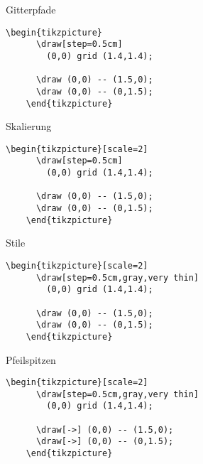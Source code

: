\begin{Frame}[t,fragile]{Gitterpfade}

  \xxx

  \begin{lstlisting}[gobble=4]
    \begin{tikzpicture}
      \draw[step=0.5cm]
        (0,0) grid (1.4,1.4);

      \draw (0,0) -- (1.5,0);
      \draw (0,0) -- (0,1.5);
    \end{tikzpicture}
  \end{lstlisting}
\end{Frame}

\begin{Frame}[t,fragile]{Skalierung}

  \xxx

  \begin{lstlisting}[gobble=4]
    \begin{tikzpicture}[scale=2]
      \draw[step=0.5cm]
        (0,0) grid (1.4,1.4);

      \draw (0,0) -- (1.5,0);
      \draw (0,0) -- (0,1.5);
    \end{tikzpicture}
  \end{lstlisting}
\end{Frame}

\begin{Frame}[t,fragile]{Stile}

  \xxx

  \begin{lstlisting}[gobble=4]
    \begin{tikzpicture}[scale=2]
      \draw[step=0.5cm,gray,very thin]
        (0,0) grid (1.4,1.4);

      \draw (0,0) -- (1.5,0);
      \draw (0,0) -- (0,1.5);
    \end{tikzpicture}
  \end{lstlisting}
\end{Frame}

\begin{Frame}[t,fragile]{Pfeilspitzen}

  \xxx

  \begin{lstlisting}[gobble=4]
    \begin{tikzpicture}[scale=2]
      \draw[step=0.5cm,gray,very thin]
        (0,0) grid (1.4,1.4);

      \draw[->] (0,0) -- (1.5,0);
      \draw[->] (0,0) -- (0,1.5);
    \end{tikzpicture}
  \end{lstlisting}
\end{Frame}

